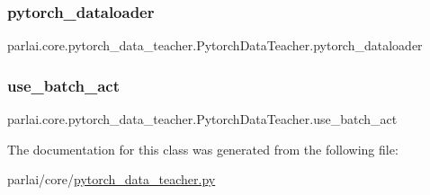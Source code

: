 \subsubsection{\texorpdfstring{pytorch\+\_\+dataloader}{pytorch\_dataloader}}
{\footnotesize\ttfamily parlai.\+core.\+pytorch\+\_\+data\+\_\+teacher.\+Pytorch\+Data\+Teacher.\+pytorch\+\_\+dataloader}

\mbox{\label{classparlai_1_1core_1_1pytorch__data__teacher_1_1PytorchDataTeacher_ab332dd1715cc19c97b5dfbe69815cdcc}} 
\subsubsection{\texorpdfstring{use\+\_\+batch\+\_\+act}{use\_batch\_act}}
{\footnotesize\ttfamily parlai.\+core.\+pytorch\+\_\+data\+\_\+teacher.\+Pytorch\+Data\+Teacher.\+use\+\_\+batch\+\_\+act}



The documentation for this class was generated from the following file\+:\begin{DoxyCompactItemize}
\item 
parlai/core/\hyperlink{pytorch__data__teacher_8py}{pytorch\+\_\+data\+\_\+teacher.\+py}\end{DoxyCompactItemize}
